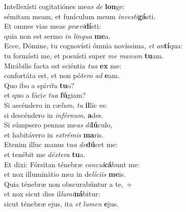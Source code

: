 \evenverse Intellexísti cogitatiónes me\textit{as} \textit{de} \textbf{lon}ge:~\*\\
\evenverse sémitam meam, et funículum meum \textit{in}\textit{ve}\textit{sti}\textbf{gá}sti.\\
\oddverse Et omnes vias meas \textit{præ}\textit{vi}\textbf{dí}sti:~\*\\
\oddverse quia non est sermo \textit{in} \textit{lin}\textit{gua} \textbf{me}a.\\
\evenverse Ecce, Dómine, tu cognovísti ómnia novíssima, \textit{et} \textit{an}\textbf{tí}qua:~\*\\
\evenverse tu formásti me, et posuísti super \textit{me} \textit{ma}\textit{num} \textbf{tu}am.\\
\oddverse Mirábilis facta est sciéntia \textit{tu}\textit{a} \textbf{ex} me:~\*\\
\oddverse confortáta est, et non pó\textit{te}\textit{ro} \textit{ad} \textbf{e}am.\\
\evenverse Quo ibo a spí\textit{ri}\textit{tu} \textbf{tu}o?~\*\\
\evenverse et quo a fáci\textit{e} \textit{tu}\textit{a} \textbf{fú}giam?\\
\oddverse Si ascéndero in cæ\textit{lum}, \textit{tu} \textbf{il}lic es:~\*\\
\oddverse si descéndero in \textit{in}\textit{fér}\textit{num}, \textbf{a}des.\\
\evenverse Si súmpsero pennas me\textit{as} \textit{di}\textbf{lú}culo,~\*\\
\evenverse et habitávero in \textit{ex}\textit{tré}\textit{mis} \textbf{ma}ris.\\
\oddverse Etenim illuc manus tu\textit{a} \textit{de}\textbf{dú}cet me:~\*\\
\oddverse et tenébit me \textit{déx}\textit{te}\textit{ra} \textbf{tu}a.\\
\evenverse Et dixi: Fórsitan ténebræ \textit{con}\textit{cul}\textbf{cá}bunt me:~\*\\
\evenverse et nox illuminátio mea in de\textit{lí}\textit{ci}\textit{is} \textbf{me}is.\\
\oddverse Quia ténebræ non obscurabúntur a te,~+\\
\oddverse  et nox sicut dies il\textit{lu}\textit{mi}\textbf{ná}bitur:~\*\\
\oddverse sicut ténebræ ejus, ita \textit{et} \textit{lu}\textit{men} \textbf{e}jus.\\
